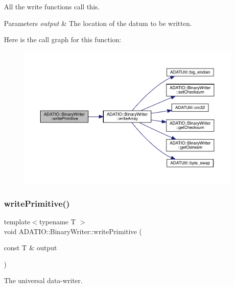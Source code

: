 All the write functions call this. 
\begin{DoxyParams}{Parameters}
{\em output} & The location of the datum to be written. \\
\hline
\end{DoxyParams}
Here is the call graph for this function\+:
\nopagebreak
\begin{figure}[H]
\begin{center}
\leavevmode
\includegraphics[width=350pt]{db/dee/classADATIO_1_1BinaryWriter_a4415e2d04de75ea6310a8eed3be8f43e_cgraph}
\end{center}
\end{figure}
\mbox{\label{classADATIO_1_1BinaryWriter_a4415e2d04de75ea6310a8eed3be8f43e}} 
\subsubsection{\texorpdfstring{writePrimitive()}{writePrimitive()}\hspace{0.1cm}{\footnotesize\ttfamily [3/3]}}
{\footnotesize\ttfamily template$<$typename T $>$ \\
void A\+D\+A\+T\+I\+O\+::\+Binary\+Writer\+::write\+Primitive (\begin{DoxyParamCaption}\item[{const T \&}]{output }\end{DoxyParamCaption})\hspace{0.3cm}{\ttfamily [protected]}}



The universal data-\/writer. 

